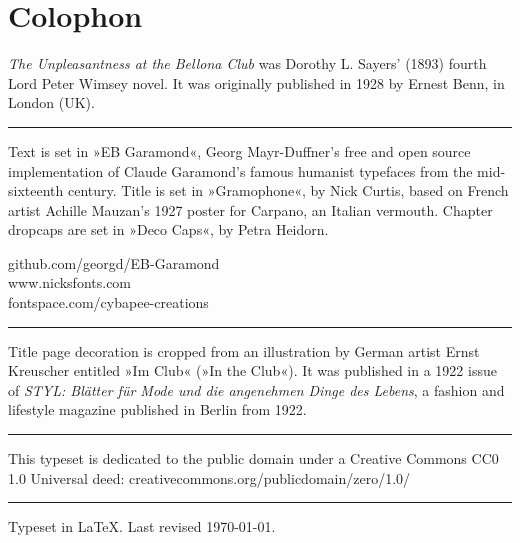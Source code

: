 \documentclass[
a5paper,
]{scrbook} %
\begin{document}
\chapter*{Colophon}
\begin{center}
\begin{minipage}{\textwidth}
\textit{The Unpleasantness at the Bellona Club} was Dorothy L. Sayers' (1893) fourth Lord Peter Wimsey novel. It was originally published in 1928 by Ernest Benn, in London (UK).
\end{minipage}
\vfill
\rule{0.5\textwidth}{.4pt}
\vfill
\begin{minipage}{\textwidth}
Text is set in »EB Garamond«, Georg Mayr-Duffner's free and open source implementation of Claude Garamond’s famous humanist typefaces from the mid-sixteenth century. Title is set in »Gramophone«, by Nick Curtis, based on French artist Achille Mauzan’s 1927 poster for Carpano, an Italian vermouth. Chapter dropcaps are set in »Deco Caps«, by Petra Heidorn.
\end{minipage}
\vfill
github.com/georgd/EB-Garamond\\www.nicksfonts.com\\fontspace.com/cybapee-creations
\vfill
\rule{0.5\textwidth}{.4pt}
\vfill
\begin{minipage}{\textwidth}
Title page decoration is cropped from an illustration by German artist Ernst Kreuscher entitled »Im Club« (»In the Club«). It was published in a 1922 issue of \textit{STYL: Blätter für Mode und die angenehmen Dinge des Lebens}, a fashion and lifestyle magazine published in Berlin from 1922.
\end{minipage}
\vfill
\rule{0.5\textwidth}{.4pt}
\vfill
\begin{minipage}{\textwidth}
This typeset is dedicated to the public domain under a Creative Commons CC0 1.0 Universal deed: creativecommons.org/publicdomain/zero/1.0/
\end{minipage}
\vfill
\rule{0.5\textwidth}{.4pt}
\vfill
Typeset in \LaTeX{}. Last revised \today.
\end{center}
\thispagestyle{empty}
\end{document}
